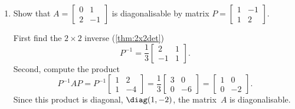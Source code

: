 \begin{example} \label{eg:diagonalise}
\begin{enumerate}
\item\label{eg:diagonalisea} 
Show that \(A=\begin{bmatrix} 0&1\\2&-1 \end{bmatrix}\) is diagonalisable by matrix \(P=\begin{bmatrix} 1&-1\\1&2 \end{bmatrix}\).
\begin{solution} 
First find the \(2\times2\) inverse (\autoref{thm:2x2det})
\begin{equation*}
P^{-1}=\frac1{3}\begin{bmatrix} 2&1\\-1&1 \end{bmatrix}.
\end{equation*}
Second, compute the product
\begin{equation*}
P^{-1}AP
=P^{-1}\begin{bmatrix} 1&2\\1&-4 \end{bmatrix}
=\frac13\begin{bmatrix} 3&0\\0&-6 \end{bmatrix}
=\begin{bmatrix} 1&0\\0&-2 \end{bmatrix}.
\end{equation*}
Since this product is diagonal, \(\diag(1,-2)\), the matrix~\(A\) is diagonalisable.
\end{solution}



\end{enumerate}
\end{example}
